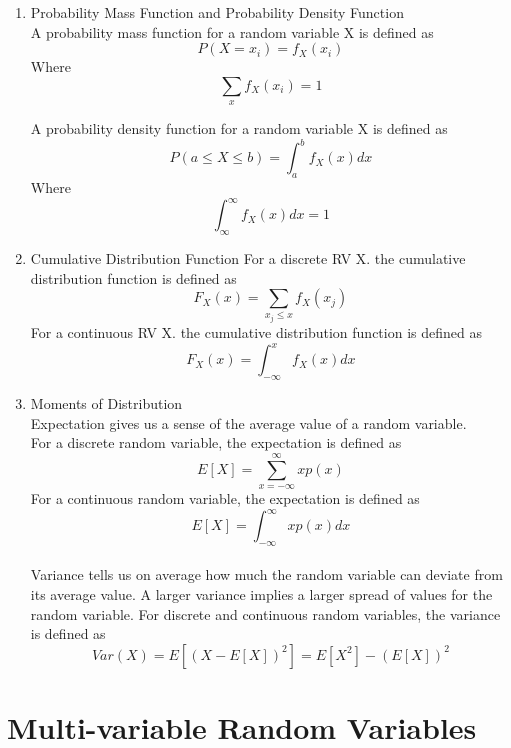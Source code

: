\documentclass{article}
\begin{document}
\begin{enumerate}
    \item Probability Mass Function and Probability Density Function \\ 
    A probability mass function for a random variable X is defined as
    $$P(X = x_i) = f_X(x_i)$$
    Where 
    $$\sum_{x} f_X(x_i) = 1$$

    A probability density function for a random variable X is defined as
    $$P(a \leq X \leq b) = \int_a^bf_X(x)dx$$
    Where 
    $$\int_{\infty}^{\infty}f_X(x)dx = 1$$
    
    \item Cumulative Distribution Function
    For a discrete RV X. the cumulative distribution function is defined as 
    $$F_X(x) = \sum_{x_j \leq x}f_X(x_j)$$
    For a continuous RV X. the cumulative distribution function is defined as 
    $$F_X(x) = \int_{-\infty}^{x}f_X(x)dx$$

    \item Moments of Distribution \\
    Expectation gives us a sense of the average value of a random variable. \\
    For a discrete random variable, the expectation is defined as 
    $$E[X] = \sum_{x = -\infty}^{\infty}xp(x)$$
    For a continuous random variable, the expectation is defined as 
    $$E[X] = \int_{-\infty}^{\infty}xp(x)dx$$ \\
    Variance tells us on average how much the random variable can deviate from its average value. A larger variance implies a larger spread of values for the random variable.
    For discrete and continuous random variables, the variance is defined as 
    $$Var(X) = E[(X - E[X])^2] = E[X^2] - (E[X])^2$$

         
\end{enumerate}

\section{Multi-variable Random Variables}
\end{document}
